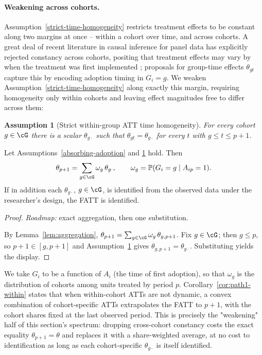 \documentclass{article}
\newtheorem{assumption}{Assumption}
\renewcommand{\P}{\mathbb{P}}
\begin{document}
\paragraph{Weakening across cohorts.} Assumption~\ref{strict-time-homogeneity} restricts treatment effects to be constant along two margins at once -- within a cohort over time, and across cohorts. A great deal of recent literature in causal inference for panel data has explicitly rejected constancy across cohorts, positing that treatment effects may vary by when the treatment was first implemented \citep{sunEstimatingDynamicTreatment2021,brownDynamicTreatmentEffect2025}; proposals for group-time effects $\theta_{gt}$ capture this by encoding adoption timing in $G_i = g$. We weaken Assumption~\ref{strict-time-homogeneity} along exactly this margin, requiring homogeneity only within cohorts and leaving effect magnitudes free to differ across them:
\begin{assumption}[Strict within-group ATT time homogeneity]\label{within-group-strict-time-homogeneity}
For every cohort $g \in \cG$ there is a scalar $\theta_{g\cdot}$ such that $\theta_{gt} = \theta_{g\cdot}$ for every $t$ with $g \leq t \leq p+1$.
\end{assumption}

\begin{corollary}\label{cor:path1-within}
Let Assumptions~\ref{absorbing-adoption} and \ref{within-group-strict-time-homogeneity} hold. Then
\[
\theta_{p+1} = \sum_{g \in \cG} \omega_g\, \theta_{g\cdot}, \qquad \omega_g = \P(G_i = g \mid A_{ip}=1).
\]
If in addition each $\theta_{g\cdot}$, $g \in \cG$, is identified from the observed data under the researcher's design, the FATT is identified.
\end{corollary}

\begin{proof}
\textit{Roadmap:} exact aggregation, then one substitution.

By Lemma~\ref{lem:aggregation}, $\theta_{p+1} = \sum_{g\in\cG}\omega_g\,\theta_{g,p+1}$. Fix $g \in \cG$; then $g \leq p$, so $p+1 \in [g,p+1]$ and Assumption~\ref{within-group-strict-time-homogeneity} gives $\theta_{g,p+1} = \theta_{g\cdot}$. Substituting yields the display.
\end{proof}

We take $G_i$ to be a function of $A_i$ (the time of first adoption), so that $\omega_g$ is the distribution of cohorts among units treated by period $p$. Corollary~\ref{cor:path1-within} states that when within-cohort ATTs are not dynamic, a convex combination of cohort-specific ATTs extrapolates the FATT to $p+1$, with the cohort shares fixed at the last observed period. This is precisely the "weakening" half of this section's spectrum: dropping cross-cohort constancy costs the exact equality $\theta_{p+1}=\theta$ and replaces it with a share-weighted average, at no cost to identification as long as each cohort-specific $\theta_{g\cdot}$ is itself identified.
\end{document}
